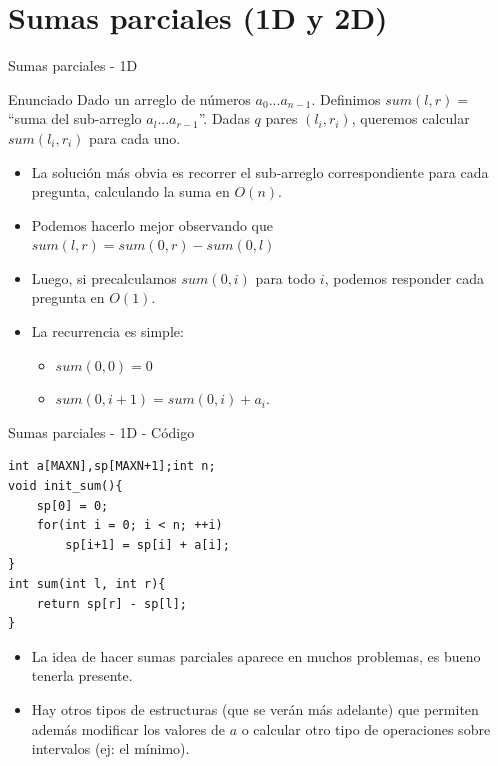 \documentclass{beamer}
\begin{document}
\section{Sumas parciales (1D y 2D)}

\begin{frame}{Sumas parciales - 1D}
\begin{block}{Enunciado}
Dado un arreglo de n\'umeros $a_0...a_{n-1}$. Definimos $sum(l,r) = $ ``suma del sub-arreglo $a_l...a_{r-1}$''. Dadas $q$ pares $(l_i,r_i)$, queremos calcular $sum(l_i,r_i)$ para cada uno.
\end{block}
\begin{itemize}
\item
La soluci\'on m\'as obvia es recorrer el sub-arreglo correspondiente para cada pregunta, calculando la suma en $O(n)$.
\item
Podemos hacerlo mejor observando que $sum(l,r) = sum(0,r) - sum(0,l)$
\item
Luego, si precalculamos $sum(0,i)$ para todo $i$, podemos responder cada pregunta en $O(1)$.
\item
La recurrencia es simple:
\begin{itemize}
\item
$sum(0,0) = 0$
\item
$sum(0,i+1) = sum(0,i) + a_{i}$.
\end{itemize}
\end{itemize}
\end{frame}
\begin{frame}[fragile]{Sumas parciales - 1D - C\'odigo}
\begin{lstlisting}
int a[MAXN],sp[MAXN+1];int n;
void init_sum(){
	sp[0] = 0;
	for(int i = 0; i < n; ++i)
		sp[i+1] = sp[i] + a[i];
}
int sum(int l, int r){
	return sp[r] - sp[l];
}
\end{lstlisting}
\begin{itemize}
\item
La idea de hacer sumas parciales aparece en muchos problemas, es bueno tenerla presente.
\item
Hay otros tipos de estructuras (que se ver\'an m\'as adelante) que permiten adem\'as modificar los valores de $a$ o calcular otro tipo de operaciones sobre intervalos (ej: el m\'inimo).

\end{itemize}
\end{frame}
\end{document}
